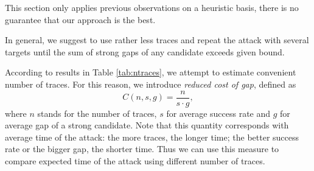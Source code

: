 \begin{note}
	This section only applies previous observations on a heuristic basis, there is no guarantee that our approach is the best.
\end{note}

In general, we suggest to use rather less traces and repeat the attack with several targets until the sum of strong gaps of any candidate exceeds given bound.

According to results in Table \ref{tab:ntraces}, we attempt to estimate convenient number of traces. For this reason, we introduce {\em reduced cost of gap}, defined as
\begin{equation}
\label{eq:redcost}
	C(n, s, g) = \frac{n}{s\cdot g} ,
\end{equation}
where $n$ stands for the number of traces, $s$ for average success rate and $g$ for average gap of a strong candidate. Note that this quantity corresponds with average time of the attack: the more traces, the longer time; the better success rate or the bigger gap, the shorter time. Thus we can use this measure to compare expected time of the attack using different number of traces.






